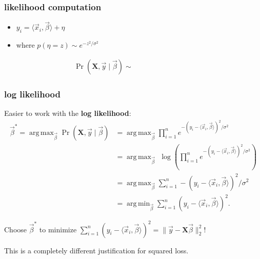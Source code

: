 \documentclass[handout,compress]{beamer}
\newcommand{\bv}[1]{\mathbf{#1}}
\DeclareMathOperator*{\argmin}{arg\,min}
\DeclareMathOperator*{\argmax}{arg\,max}
\begin{document}
\begin{frame}[t]
	\frametitle{likelihood computation}
	\begin{itemize}
		\item $y_i = \langle \vec{x}_i, \vec{\beta} \rangle+ \eta$
		\item where $p(\eta = z) \sim e^{-z^2/\sigma^2}$
		\vspace{1em}
		
		\begin{align*}
		\Pr(\bv{X},\vec{y}  \mid  \vec{\beta} ) \sim \hspace{10em}
		\end{align*}
	\end{itemize}
\end{frame}

\begin{frame}
	\frametitle{log likelihood}
	Easier to work with the \alert{\textbf{log likelihood}}:
	\begin{align*}
	\vec{\beta}^* = \argmax_{\vec{\beta}}  \Pr(\bv{X},\vec{y}  \mid  \vec{\beta}) &=\argmax_{\vec{\beta}} \prod_{i=1}^n e^{-(y_i - \langle \vec{x}_i, \vec{\beta} \rangle)^2/\sigma^2} \\ 
	&= \argmax_{\vec{\beta}}\,\, \log\left(\prod_{i=1}^n e^{-(y_i - \langle \vec{x}_i, \vec{\beta} \rangle)^2/\sigma^2} \right)\\
	&= \argmax_{\vec{\beta}}  \sum_{i=1}^n -(y_i - \langle \vec{x}_i, \vec{\beta} \rangle)^2/\sigma^2\\
	&= \argmin_{\vec{\beta}}  \sum_{i=1}^n (y_i - \langle \vec{x}_i, \vec{\beta} \rangle)^2.
	\end{align*}
	
	Choose $\vec{\beta}^*$ to minimize $\sum_{i=1}^n (y_i - \langle \vec{x}_i, \vec{\beta} \rangle)^2 = \|\vec{y} - \bv{X}\vec{\beta}\|_2^2$!
	
	
	\alert{This is a completely different justification for squared loss.}
\end{frame}
\end{document}

